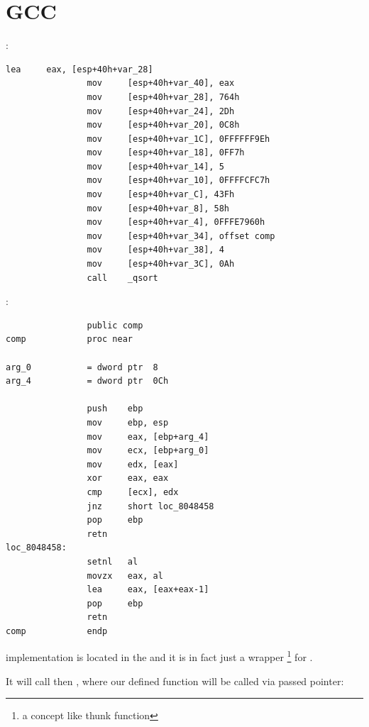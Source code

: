 \section{GCC}

:

\begin{lstlisting}[caption=GCC]
                lea     eax, [esp+40h+var_28]
                mov     [esp+40h+var_40], eax
                mov     [esp+40h+var_28], 764h
                mov     [esp+40h+var_24], 2Dh
                mov     [esp+40h+var_20], 0C8h
                mov     [esp+40h+var_1C], 0FFFFFF9Eh
                mov     [esp+40h+var_18], 0FF7h
                mov     [esp+40h+var_14], 5
                mov     [esp+40h+var_10], 0FFFFCFC7h
                mov     [esp+40h+var_C], 43Fh
                mov     [esp+40h+var_8], 58h
                mov     [esp+40h+var_4], 0FFFE7960h
                mov     [esp+40h+var_34], offset comp
                mov     [esp+40h+var_38], 4
                mov     [esp+40h+var_3C], 0Ah
                call    _qsort
\end{lstlisting}

:

\begin{lstlisting}
                public comp
comp            proc near

arg_0           = dword ptr  8
arg_4           = dword ptr  0Ch

                push    ebp
                mov     ebp, esp
                mov     eax, [ebp+arg_4]
                mov     ecx, [ebp+arg_0]
                mov     edx, [eax]
                xor     eax, eax
                cmp     [ecx], edx
                jnz     short loc_8048458
                pop     ebp
                retn
loc_8048458:
                setnl   al
                movzx   eax, al
                lea     eax, [eax+eax-1]
                pop     ebp
                retn
comp            endp
\end{lstlisting}

{\qsort implementation is located in the  and it is in fact just a wrapper
\footnote{a concept like \gls{thunk function}} for .}

{It will call then , where our defined function will be called via passed pointer:}


